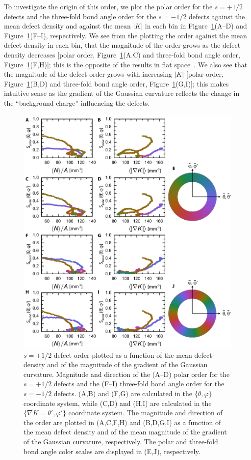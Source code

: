 To investigate the origin of this order, we plot the polar order for the $s = +1/2$ defects and the three-fold bond angle order for the $s = -1/2$ defects against the mean defect density and against the mean $|K|$ in each bin in Figure~\ref{f:7-Orient_PolarHex}(A--D) and Figure~\ref{f:7-Orient_PolarHex}(F--I), respectively.
We see from the plotting the order against the mean defect density in each bin, that the magnitude of the order grows as the defect density decreases [polar order, Figure~\ref{f:7-Orient_PolarHex}(A.C) and three-fold bond angle order, Figure~\ref{f:7-Orient_PolarHex}(F,H)]; this is the opposite of the results in flat space~\cite{RN27}.
We also see that the magnitude of the defect order grows with increasing $|K|$ [polar order, Figure~\ref{f:7-Orient_PolarHex}(B,D) and three-fold bond angle order, Figure~\ref{f:7-Orient_PolarHex}(G,I)]; this makes intuitive sense as the gradient of the Gaussian curvature reflects the change in the ``background charge'' influencing the defects.
\begin{figure}
  \centering
  \includegraphics{figures/C7/Ch7-Figs_Orient_PolarHex.png}
  \caption{$s = \pm 1/2$ defect order plotted as a function of the mean defect density and of the magnitude of the gradient of the Gaussian curvature.
  Magnitude and direction of the (A--D) polar order for the $s = +1/2$ defects and the (F--I) three-fold bond angle order for the $s = -1/2$ defects.
  (A,B) and (F,G) are calculated in the $\{\theta,\varphi \}$ coordinate system, while (C,D) and (H,I) are calculated in the $\{ \nabla K = \theta',\varphi' \}$ coordinate system.
  The magnitude and direction of the order are plotted in (A,C,F,H) and (B,D,G,I) as a function of the mean defect density and of the mean magnitude of the gradient of the Gaussian curvature, respectively.
  The polar and three-fold bond angle color scales are displayed in (E,J), respectively.
  }\label{f:7-Orient_PolarHex}
\end{figure}


